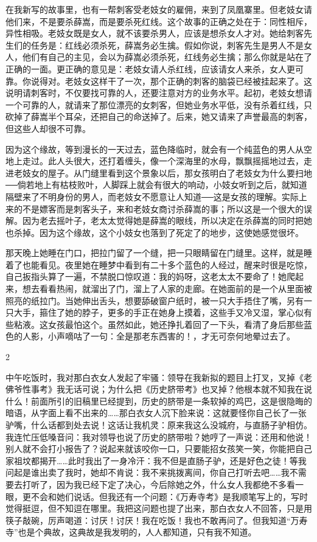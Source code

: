 在我新写的故事里，也有一帮刺客受老妓女的雇佣，来到了凤凰寨里。但老妓女请他们来，不是要杀薛嵩，而是要杀死红线。这个故事的正确之处在于：同性相斥，异性相吸。老妓女既是女人，就不该要杀男人，应该是想杀女人才对。她给刺客先生们的任务是：红线必须杀死，薛嵩务必生擒。假如你说，刺客先生是男人不是女人，他们有自己的主见，会以为薛嵩必须杀死，红线务必生擒；那么你就是站在了正确的一面。更正确的意见是：老妓女请人杀红线，应该请女人来杀，女人更可靠。你说得对。老妓女这样干了一次，那个正确的刺客的脑袋已经被挂起来了。这说明请刺客时，不仅要找可靠的人，还要注意对方的业务水平。起初，老妓女想请一个可靠的人，就请来了那位漂亮的女刺客，但她业务水平低，没有杀着红线，只砍掉了薛嵩半个耳朵，还把自己的命送掉了。后来，她又请来了声誉最高的刺客，但这些人却很不可靠。 

因为这个缘故，等到漫长的一天过去，蓝色降临时，就会有一个纯蓝色的男人从空地上走过。此人头很大，还打着缠头，像一个深海里的水母，飘飘摇摇地过去，走进老妓女的屋子。从门缝里看到这个景象以后，那女孩明白了老妓女为什么要扫地──倘若地上有枯枝败叶，人脚踩上就会有很大的响动，小妓女听到之后，就知道隔壁来了不明身份的男人，而老妓女不愿意让人知道──这是女孩的理解。实际上来的不是嫖客而是刺客头子，来和老妓女商讨杀薛嵩的事；所以这是一个很大的误解。因为老去摇叶子，老太太觉得她是薛嵩的眼线，所以决定在杀薛嵩的同时把她也杀掉。因为这个缘故，这个小妓女也落到了死定了的地步，这使她感觉很坏。 

那天晚上她睡在门口，把拉门留了一个缝，把一只眼睛留在门缝里。这样，就是睡着了也能看见。夜里她在睡梦中看到有二十多个蓝色的人经过，醒来时很是吃惊，自己扳指头算了一遍，不禁脱口惊叹道：我的妈呀，这老太太不要命了！她爬起来，想去看看热闹，就溜出了门，溜上了人家的走廊。在她面前的是一个从里面被照亮的纸拉门。当她伸出舌头，想要舔破窗户纸时，被一只大手捂住了嘴，另有一只大手，箍住了她的脖子，更多的手正在她身上摸着，这些手又冷又湿，掌心似有些粘液。这女孩最怕这个。虽然如此，她还挣扎着回了一下头，看清了身后那些蓝色的人影，小声嘀咕了一句：全是那老东西害的！，才无可奈何地晕过去了。 

2 

中午吃饭时，我对那白衣女人发起了牢骚：领导在我新拟的题目上打叉，叉掉《老佛爷性事考》我无话可说；为什么把《历史脐带考》也叉掉？他根本就不知我在说什么！前面所引的旧稿里已经提到，历史的脐带是一条软掉的鸡巴，这是很隐晦的暗语，从字面上看不出来的……那白衣女人沉下脸来说：这就要怪你自己长了一张驴嘴，什么话都到处去说！这话让我机灵：原来我这么没城府，与直肠子驴相仿。我连忙压低嗓音问：我对领导也说了历史的脐带啦？她哼了一声说：还用和他说！别人就不会打小报告了？说起来就该咬你一口，只要能招女孩笑一笑，你能把自己家祖坟都揭开……此时我出了一身冷汗：我不但是直肠子驴，还是好色之徒！等我问起是谁出卖了我时，她却不肯说：我不来挑拨离间，你自己打听去吧……我不需要去打听了，因为我已经下定了决心，今后除她之外，什么女人我都绝不多看一眼，更不会和她们说话。但我还有一个问题：《万寿寺考》是我顺笔写上的，写时觉得挺逗，但不知逗在哪里。我把这问题也提了出来，那白衣女人不回答，只是用筷子敲碗，厉声喝道：讨厌！讨厌！我在吃饭！我也不敢再问了。但我知道“万寿寺”也是个典故，这典故是我发明的，人人都知道，只有我不知道。 

